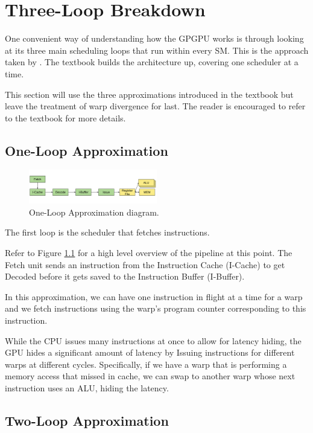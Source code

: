 \chapter{Three-Loop Breakdown}

One convenient way of understanding how the GPGPU works is through
looking at its three main scheduling loops that run within every SM.
This is the approach taken by \cite{aamodt2018general}.
The textbook builds the architecture up, covering one scheduler at a time.

This section will use the three approximations introduced in the textbook but
leave the treatment of warp divergence for last. The reader is encouraged to
refer to the textbook for more details.

\section{One-Loop Approximation}

\begin{figure}[h]
    \centering
    \includegraphics[width=0.5\textwidth]{assets/1.png}
    \caption{One-Loop Approximation diagram. }
    \label{fig:oneloop}
\end{figure}

The first loop is the scheduler that fetches instructions. 

Refer to Figure \ref{fig:oneloop} for a high level overview of the pipeline at this point.
The Fetch unit sends an instruction from the Instruction Cache (I-Cache) to
get Decoded before it gets saved to the Instruction Buffer (I-Buffer).

In this approximation, we can have one instruction in flight at a time for
a warp and we fetch instructions using the warp's program counter corresponding
to this instruction.

While the CPU issues many instructions at once to allow for latency
hiding, the GPU hides a significant amount of latency by Issuing
instructions for different warps at different cycles. Specifically, if we have
a warp that is performing a memory access that missed in cache, we can swap
to another warp whose next instruction uses an ALU, hiding the latency.

\section{Two-Loop Approximation}


